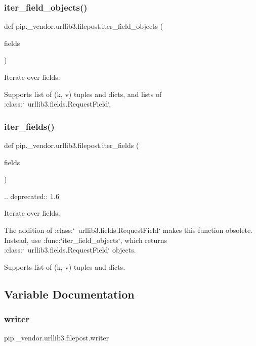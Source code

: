 \subsubsection{\texorpdfstring{iter\+\_\+field\+\_\+objects()}{iter\_field\_objects()}}
{\footnotesize\ttfamily def pip.\+\_\+vendor.\+urllib3.\+filepost.\+iter\+\_\+field\+\_\+objects (\begin{DoxyParamCaption}\item[{}]{fields }\end{DoxyParamCaption})}

\begin{DoxyVerb}Iterate over fields.

Supports list of (k, v) tuples and dicts, and lists of
:class:`~urllib3.fields.RequestField`.\end{DoxyVerb}
 \mbox{\label{namespacepip_1_1__vendor_1_1urllib3_1_1filepost_a9b0d028edac2a9153f18f7f81c67662d}} 
\subsubsection{\texorpdfstring{iter\+\_\+fields()}{iter\_fields()}}
{\footnotesize\ttfamily def pip.\+\_\+vendor.\+urllib3.\+filepost.\+iter\+\_\+fields (\begin{DoxyParamCaption}\item[{}]{fields }\end{DoxyParamCaption})}

\begin{DoxyVerb}.. deprecated:: 1.6

Iterate over fields.

The addition of :class:`~urllib3.fields.RequestField` makes this function
obsolete. Instead, use :func:`iter_field_objects`, which returns
:class:`~urllib3.fields.RequestField` objects.

Supports list of (k, v) tuples and dicts.
\end{DoxyVerb}
 

\subsection{Variable Documentation}
\mbox{\label{namespacepip_1_1__vendor_1_1urllib3_1_1filepost_a2a5d5572fb732d51d8b96d026cfdfb87}} 
\subsubsection{\texorpdfstring{writer}{writer}}
{\footnotesize\ttfamily pip.\+\_\+vendor.\+urllib3.\+filepost.\+writer}

